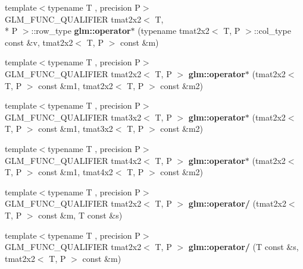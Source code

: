 \begin{DoxyCompactItemize}
\item 
\hypertarget{namespaceglm_ac6036e820bc048e15196afeac0defde7}{{\footnotesize template$<$typename T , precision P$>$ }\\G\-L\-M\-\_\-\-F\-U\-N\-C\-\_\-\-Q\-U\-A\-L\-I\-F\-I\-E\-R tmat2x2$<$ T, \\*
P $>$\-::row\-\_\-type {\bfseries glm\-::operator$\ast$} (typename tmat2x2$<$ T, P $>$\-::col\-\_\-type const \&v, tmat2x2$<$ T, P $>$ const \&m)}\label{namespaceglm_ac6036e820bc048e15196afeac0defde7}

\item 
\hypertarget{namespaceglm_a6490257bcf679a71b20a7e82ebe54188}{{\footnotesize template$<$typename T , precision P$>$ }\\G\-L\-M\-\_\-\-F\-U\-N\-C\-\_\-\-Q\-U\-A\-L\-I\-F\-I\-E\-R tmat2x2$<$ T, P $>$ {\bfseries glm\-::operator$\ast$} (tmat2x2$<$ T, P $>$ const \&m1, tmat2x2$<$ T, P $>$ const \&m2)}\label{namespaceglm_a6490257bcf679a71b20a7e82ebe54188}

\item 
\hypertarget{namespaceglm_a4d95e330a465ca1f581ca2580730bfa3}{{\footnotesize template$<$typename T , precision P$>$ }\\G\-L\-M\-\_\-\-F\-U\-N\-C\-\_\-\-Q\-U\-A\-L\-I\-F\-I\-E\-R tmat3x2$<$ T, P $>$ {\bfseries glm\-::operator$\ast$} (tmat2x2$<$ T, P $>$ const \&m1, tmat3x2$<$ T, P $>$ const \&m2)}\label{namespaceglm_a4d95e330a465ca1f581ca2580730bfa3}

\item 
\hypertarget{namespaceglm_af72b94d4ec87222f66a42ae7bd2cb4b7}{{\footnotesize template$<$typename T , precision P$>$ }\\G\-L\-M\-\_\-\-F\-U\-N\-C\-\_\-\-Q\-U\-A\-L\-I\-F\-I\-E\-R tmat4x2$<$ T, P $>$ {\bfseries glm\-::operator$\ast$} (tmat2x2$<$ T, P $>$ const \&m1, tmat4x2$<$ T, P $>$ const \&m2)}\label{namespaceglm_af72b94d4ec87222f66a42ae7bd2cb4b7}

\item 
\hypertarget{namespaceglm_a87f87c14e8af120d95833cba2543c78d}{{\footnotesize template$<$typename T , precision P$>$ }\\G\-L\-M\-\_\-\-F\-U\-N\-C\-\_\-\-Q\-U\-A\-L\-I\-F\-I\-E\-R tmat2x2$<$ T, P $>$ {\bfseries glm\-::operator/} (tmat2x2$<$ T, P $>$ const \&m, T const \&s)}\label{namespaceglm_a87f87c14e8af120d95833cba2543c78d}

\item 
\hypertarget{namespaceglm_a17739714873762c328b1379217868bd2}{{\footnotesize template$<$typename T , precision P$>$ }\\G\-L\-M\-\_\-\-F\-U\-N\-C\-\_\-\-Q\-U\-A\-L\-I\-F\-I\-E\-R tmat2x2$<$ T, P $>$ {\bfseries glm\-::operator/} (T const \&s, tmat2x2$<$ T, P $>$ const \&m)}\label{namespaceglm_a17739714873762c328b1379217868bd2}


\end{DoxyCompactItemize}
